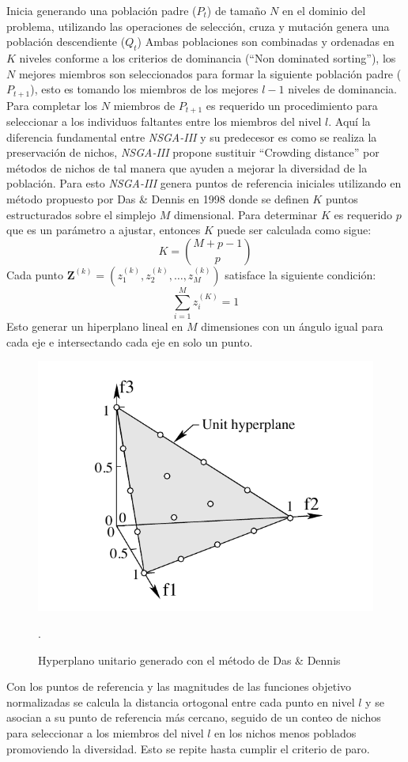 \documentclass[letterpaper,10pt]{article}
\begin{document}
Inicia generando una población padre ($P_t$) de tamaño $N$ en el dominio del problema, utilizando las operaciones de selección, cruza y mutación genera una población descendiente ($Q_t$)
Ambas poblaciones son combinadas y ordenadas en $K$ niveles conforme a los criterios de dominancia (``Non dominated sorting''), los $N$ mejores miembros son seleccionados para formar
la siguiente población padre ($P_{t+1}$), esto es tomando los miembros de los mejores $l-1$ niveles de dominancia. Para completar los $N$ miembros de $P_{t+1}$ es requerido un procedimiento
para seleccionar a los individuos faltantes entre los miembros del nivel $l$. Aquí la diferencia fundamental entre \emph{NSGA-III} y su predecesor es como se realiza la preservación de nichos,
\emph{NSGA-III} propone sustituir ``Crowding distance'' por métodos de nichos de tal manera que ayuden a mejorar la diversidad de la población. Para esto \emph{NSGA-III} genera puntos de referencia
iniciales utilizando en método propuesto por Das \& Dennis en 1998 \cite{Das:1998:NIN:588907.589322} donde se definen $K$ puntos estructurados sobre el simplejo $M$ dimensional.
Para determinar $K$ es requerido $p$ que es un parámetro a ajustar, entonces $K$ puede ser calculada como sigue:
  $$K= {M+p-1 \choose p}$$
Cada punto $\bm{Z}^{(k)}=(z_1^{(k)},z_2^{(k)}, \dots, z_M^{(k)})$ satisface la siguiente condición:
  $$\sum_{i=1}^M z_i^{(K)} = 1$$
Esto generar un hiperplano lineal en $M$ dimensiones con un ángulo igual para cada eje e intersectando cada eje en solo un punto.

\begin{figure}[h]
 \centering
\includegraphics[scale=0.35]{hyper.png}
\caption{Hyperplano unitario generado con el método de Das \& Dennis}.
\end{figure}
Con los puntos de referencia y las magnitudes de las funciones objetivo normalizadas se calcula la distancia ortogonal entre cada punto en nivel $l$ y se asocian a su punto de referencia más cercano,
seguido de un conteo de nichos para seleccionar a los miembros del nivel $l$ en los nichos menos poblados promoviendo la diversidad. Esto se repite hasta cumplir el criterio de paro.
\end{document}
